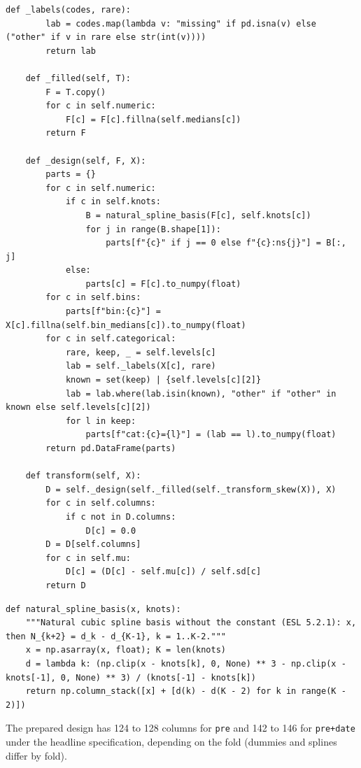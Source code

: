 \documentclass[11pt]{article}
\begin{document}
\begin{lstlisting}[caption={Building and applying the design (scripts/modeling.py)}]
    def _labels(codes, rare):
        lab = codes.map(lambda v: "missing" if pd.isna(v) else ("other" if v in rare else str(int(v))))
        return lab

    def _filled(self, T):
        F = T.copy()
        for c in self.numeric:
            F[c] = F[c].fillna(self.medians[c])
        return F

    def _design(self, F, X):
        parts = {}
        for c in self.numeric:
            if c in self.knots:
                B = natural_spline_basis(F[c], self.knots[c])
                for j in range(B.shape[1]):
                    parts[f"{c}" if j == 0 else f"{c}:ns{j}"] = B[:, j]
            else:
                parts[c] = F[c].to_numpy(float)
        for c in self.bins:
            parts[f"bin:{c}"] = X[c].fillna(self.bin_medians[c]).to_numpy(float)
        for c in self.categorical:
            rare, keep, _ = self.levels[c]
            lab = self._labels(X[c], rare)
            known = set(keep) | {self.levels[c][2]}
            lab = lab.where(lab.isin(known), "other" if "other" in known else self.levels[c][2])
            for l in keep:
                parts[f"cat:{c}={l}"] = (lab == l).to_numpy(float)
        return pd.DataFrame(parts)

    def transform(self, X):
        D = self._design(self._filled(self._transform_skew(X)), X)
        for c in self.columns:
            if c not in D.columns:
                D[c] = 0.0
        D = D[self.columns]
        for c in self.mu:
            D[c] = (D[c] - self.mu[c]) / self.sd[c]
        return D
\end{lstlisting}

\begin{lstlisting}[caption={Natural cubic spline basis (scripts/modeling.py)}]
def natural_spline_basis(x, knots):
    """Natural cubic spline basis without the constant (ESL 5.2.1): x, then N_{k+2} = d_k - d_{K-1}, k = 1..K-2."""
    x = np.asarray(x, float); K = len(knots)
    d = lambda k: (np.clip(x - knots[k], 0, None) ** 3 - np.clip(x - knots[-1], 0, None) ** 3) / (knots[-1] - knots[k])
    return np.column_stack([x] + [d(k) - d(K - 2) for k in range(K - 2)])
\end{lstlisting}

The prepared design has 124 to 128 columns for \texttt{pre} and 142 to 146 for \texttt{pre+date} under the headline specification, depending on the fold (dummies and splines differ by fold).
\end{document}
